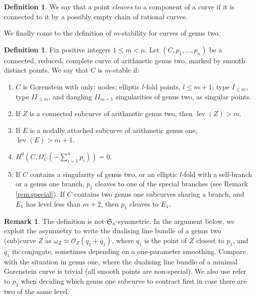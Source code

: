 \documentclass[11pt]{amsart}
\newcommand{\OO}{\mathcal O}
\newcommand{\lev}{\operatorname{lev}}
\theoremstyle{plain}
\theoremstyle{definition}
\newtheorem{dfn}[thm]{Definition}
\newtheorem{rem}[thm]{Remark}
\begin{document}
\begin{dfn}
We say that a point \emph{cleaves} to a component of a curve if it is connected to it by a possibly empty chain of rational curves. 
\end{dfn}

We finally come to the definition of $m$-stability for curves of genus two.
\begin{dfn}\label{def:m-stability}
 Fix positive integers $1\leq m<n$. Let $(C,p_1,\ldots,p_n)$ be a connected, reduced, complete curve of arithmetic genus two, marked by smooth distinct points. We say that $C$ is $m$-stable if:
 \begin{enumerate}[leftmargin=.7cm]
  \item\label{cond:sing} $C$ is Gorenstein with only: nodes; elliptic $l$-fold points, $l\leq m+1$; type $I_{\leq m}$, type $I\!I_{\leq m}$, and dangling $I\!I_{m+1}$ singularities of genus two, as singular points.
  \item\label{cond:lev2} If $Z$ is a connected subcurve of arithmetic genus two, then $\lev(Z)>m$.
  \item\label{cond:lev1} If $E$ is a nodally attached subcurve of arithmetic genus one, $\lev(E)>m+1$.
  \item\label{cond:aut} $H^0(C,\Omega_C^\vee(-\sum_{i=1}^n p_i))=0$.
  \item\label{cond:p1} If $C$ contains a singularity of genus two, or an elliptic $l$-fold with a self-branch or a genus one branch, $p_1$ cleaves to one of the special branches (see Remark \ref{rem:special}). If $C$ contains two genus one subcurves sharing a branch, and $E_1$ has level less than $m+2$, then $p_1$ cleaves to $E_1$.
 \end{enumerate}
\end{dfn}

\begin{rem}
 The definition is not $\mathfrak{S}_n$-symmetric. In the argument below, we exploit the asymmetry to write the dualising line bundle of a genus two (sub)curve $Z$ as $\omega_Z\simeq\OO_Z(q_1+\bar q_1)$, where $q_1$ is the point of $Z$ closest to $p_1$, and $\bar q_1$ its conjugate, sometimes depending on a one-parameter smoothing. Compare with the situation in genus one, where the dualising line bundle of a minimal Gorenstein curve is trivial (all smooth points are non-special). We also use refer to $p_1$ when deciding which genus one subcurve to contract first in case there are two of the same level.
\end{rem}
\end{document}
